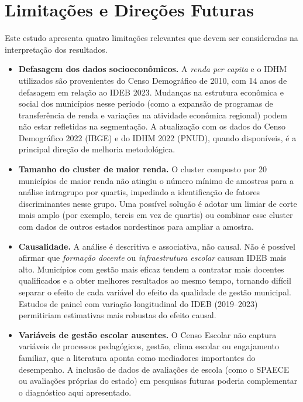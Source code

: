 \section{Limitações e Direções Futuras}

Este estudo apresenta quatro limitações relevantes que devem ser consideradas na interpretação dos resultados.
\begin{itemize}
    \item \textbf{Defasagem dos dados socioeconômicos.} A \textit{renda per capita} e o IDHM utilizados são provenientes do Censo Demográfico de 2010, com 14 anos de defasagem em relação ao IDEB 2023. Mudanças na estrutura econômica e social dos municípios nesse período (como a expansão de programas de transferência de renda e variações na atividade econômica regional) podem não estar refletidas na segmentação. A atualização com os dados do Censo Demográfico 2022 (IBGE) e do IDHM 2022 (PNUD), quando disponíveis, é a principal direção de melhoria metodológica.

    \item \textbf{Tamanho do cluster de maior renda.} O cluster composto por 20 municípios de maior renda não atingiu o número mínimo de amostras para a análise intragrupo por quartis, impedindo a identificação de fatores discriminantes nesse grupo. Uma possível solução é adotar um limiar de corte mais amplo (por exemplo, tercis em vez de quartis) ou combinar esse cluster com dados de outros estados nordestinos para ampliar a amostra.

    \item \textbf{Causalidade.} A análise é descritiva e associativa, não causal. Não é possível afirmar que \textit{formação docente} ou \textit{infraestrutura escolar} causam IDEB mais alto. Municípios com gestão mais eficaz tendem a contratar mais docentes qualificados e a obter melhores resultados ao mesmo tempo, tornando difícil separar o efeito de cada variável do efeito da qualidade de gestão municipal. Estudos de painel com variação longitudinal do IDEB (2019--2023) permitiriam estimativas mais robustas do efeito causal.

    \item \textbf{Variáveis de gestão escolar ausentes.} O Censo Escolar não captura variáveis de processos pedagógicos, gestão, clima escolar ou engajamento familiar, que a literatura aponta como mediadores importantes do desempenho. A inclusão de dados de avaliações de escola (como o SPAECE ou avaliações próprias do estado) em pesquisas futuras poderia complementar o diagnóstico aqui apresentado.
\end{itemize}

